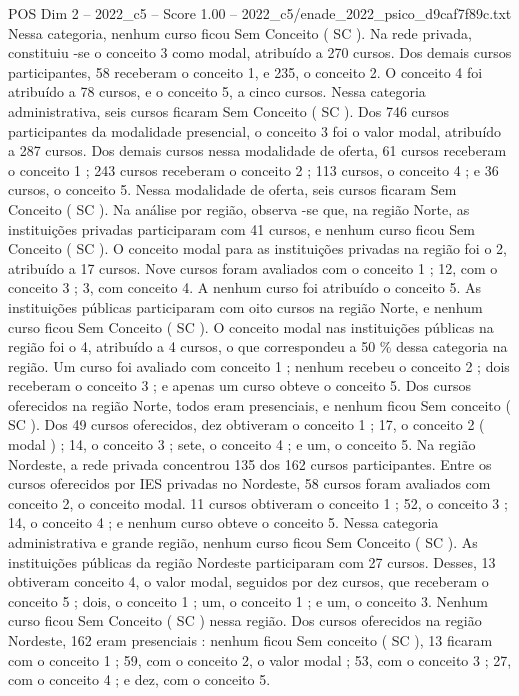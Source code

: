 \begin{textsample}{POS Dim 2 – 2022\_c5 – Score 1.00 – 2022\_c5/enade\_2022\_psico\_d9caf7f89c.txt}
Nessa categoria, nenhum curso ficou Sem Conceito ( SC ).
Na rede privada, constituiu -se o conceito 3 como modal, atribuído a 270 cursos.
Dos demais cursos participantes, 58 receberam o conceito 1, e 235, o conceito 2.
O conceito 4 foi atribuído a 78 cursos, e o conceito 5, a cinco cursos.
Nessa categoria administrativa, seis cursos ficaram Sem Conceito ( SC ).
Dos 746 cursos participantes da modalidade presencial, o conceito 3 foi o valor modal, atribuído a 287 cursos.
Dos demais cursos nessa modalidade de oferta, 61 cursos receberam o conceito 1 ; 243 cursos receberam o conceito 2 ; 113 cursos, o conceito 4 ; e 36 cursos, o conceito 5.
Nessa modalidade de oferta, seis cursos ficaram Sem Conceito ( SC ).
Na análise por região, observa -se que, na região Norte, as instituições privadas participaram com 41 cursos, e nenhum curso ficou Sem Conceito ( SC ).
O conceito modal para as instituições privadas na região foi o 2, atribuído a 17 cursos.
Nove cursos foram avaliados com o conceito 1 ; 12, com o conceito 3 ; 3, com conceito 4.
A nenhum curso foi atribuído o conceito 5.
As instituições públicas participaram com oito cursos na região Norte, e nenhum curso ficou Sem Conceito ( SC ).
O conceito modal nas instituições públicas na região foi o 4, atribuído a 4 cursos, o que correspondeu a 50 \% dessa categoria na região.
Um curso foi avaliado com conceito 1 ; nenhum recebeu o conceito 2 ; dois receberam o conceito 3 ; e apenas um curso obteve o conceito 5.
Dos cursos oferecidos na região Norte, todos eram presenciais, e nenhum ficou Sem conceito ( SC ).
Dos 49 cursos oferecidos, dez obtiveram o conceito 1 ; 17, o conceito 2 ( modal ) ; 14, o conceito 3 ; sete, o conceito 4 ; e um, o conceito 5.
Na região Nordeste, a rede privada concentrou 135 dos 162 cursos participantes.
Entre os cursos oferecidos por IES privadas no Nordeste, 58 cursos foram avaliados com conceito 2, o conceito modal. 11 cursos obtiveram o conceito 1 ; 52, o conceito 3 ; 14, o conceito 4 ; e nenhum curso obteve o conceito 5.
Nessa categoria administrativa e grande região, nenhum curso ficou Sem Conceito ( SC ).
As instituições públicas da região Nordeste participaram com 27 cursos.
Desses, 13 obtiveram conceito 4, o valor modal, seguidos por dez cursos, que receberam o conceito 5 ; dois, o conceito 1 ; um, o conceito 1 ; e um, o conceito 3.
Nenhum curso ficou Sem Conceito ( SC ) nessa região.
Dos cursos oferecidos na região Nordeste, 162 eram presenciais : nenhum ficou Sem conceito ( SC ), 13 ficaram com o conceito 1 ; 59, com o conceito 2, o valor modal ; 53, com o conceito 3 ; 27, com o conceito 4 ; e dez, com o conceito 5.

\end{textsample}
